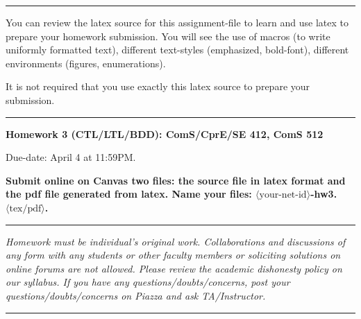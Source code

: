 \documentclass[11pt]{article}
\begin{document}
\hrule
\smallskip

\noindent

\noindent
You can review the latex source for this assignment-file to
learn and use latex to prepare your homework submission. You will see
the use of macros (to write uniformly formatted text), different
text-styles (emphasized, bold-font), different environments (figures,
enumerations).

It is not required that you use exactly this latex source to prepare
your submission. 
\smallskip
\hrule


\begin{center}
{\Large\bf Homework 3 (CTL/LTL/BDD): ComS/CprE/SE 412, ComS 512}

\medskip

Due-date: April 4 at 11:59PM.

\medskip


\end{center}

\noindent
\textbf{
Submit online on Canvas two files: the source file in latex format and
the pdf file generated from latex. Name your files:
$\langle\mbox{your-net-id}\rangle$-hw3.$\langle\mbox{tex/pdf}\rangle$.
}

\hrule
\noindent
\smallskip

\emph{ Homework must be individual's original work. Collaborations and
  discussions of any form with any students or other faculty members
  or soliciting solutions on online forums are not allowed. Please
  review the academic dishonesty policy on our syllabus. If you have
  any questions/doubts/concerns, post your questions/doubts/concerns
  on Piazza and ask TA/Instructor.}

\smallskip
\hrule
\end{document}
